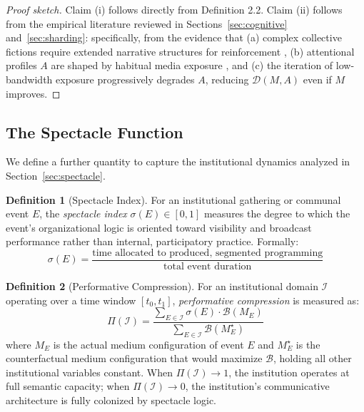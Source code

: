 \documentclass[12pt]{article}
\theoremstyle{definition}
\newtheorem{definition}{Definition}[section]
\theoremstyle{plain}
\begin{document}
\begin{proof}[Proof sketch]
Claim (i) follows directly from Definition 2.2. Claim (ii) follows from the empirical literature reviewed in Sections~\ref{sec:cognitive} and~\ref{sec:sharding}: specifically, from the evidence that (a) complex collective fictions require extended narrative structures for reinforcement \citep{Harari2015}, (b) attentional profiles $A$ are shaped by habitual media exposure \citep{Carr2010, Wolf2018}, and (c) the iteration of low-bandwidth exposure progressively degrades $A$, reducing $\mathcal{D}(M,A)$ even if $M$ improves.
\end{proof}

\subsection{The Spectacle Function}

We define a further quantity to capture the institutional dynamics analyzed in Section~\ref{sec:spectacle}.

\begin{definition}[Spectacle Index]
For an institutional gathering or communal event $E$, the \emph{spectacle index} $\sigma(E) \in [0,1]$ measures the degree to which the event's organizational logic is oriented toward visibility and broadcast performance rather than internal, participatory practice. Formally:
\begin{equation}
\sigma(E) = \frac{\text{time allocated to produced, segmented programming}}{\text{total event duration}}
\end{equation}
\end{definition}

\begin{definition}[Performative Compression]
For an institutional domain $\mathcal{I}$ operating over a time window $[t_0, t_1]$, \emph{performative compression} is measured as:
\begin{equation}
\Pi(\mathcal{I}) = \frac{\sum_{E \in \mathcal{I}} \sigma(E) \cdot \mathcal{B}(M_E)}{\sum_{E \in \mathcal{I}} \mathcal{B}(M_E^\star)}
\end{equation}
where $M_E$ is the actual medium configuration of event $E$ and $M_E^\star$ is the counterfactual medium configuration that would maximize $\mathcal{B}$, holding all other institutional variables constant. When $\Pi(\mathcal{I}) \to 1$, the institution operates at full semantic capacity; when $\Pi(\mathcal{I}) \to 0$, the institution's communicative architecture is fully colonized by spectacle logic.
\end{definition}
\end{document}
